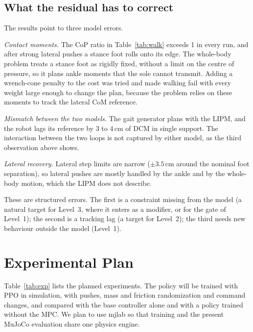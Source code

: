\documentclass[conference]{IEEEtran}
\begin{document}
\subsection{What the residual has to correct}
The results point to three model errors.

\emph{Contact moments.} The CoP ratio in Table~\ref{tab:walk} exceeds 1 in every run, and after strong lateral pushes a stance foot rolls onto its edge.
The whole-body problem treats a stance foot as rigidly fixed, without a limit on the centre of pressure, so it plans ankle moments that the sole cannot transmit.
Adding a wrench-cone penalty to the cost was tried and made walking fail with every weight large enough to change the plan, because the problem relies on these moments to track the lateral CoM reference.

\emph{Mismatch between the two models.} The gait generator plans with the LIPM, and the robot lags its reference by 3 to 4\,cm of DCM in single support.
The interaction between the two loops is not captured by either model, as the third observation above shows.

\emph{Lateral recovery.} Lateral step limits are narrow ($\pm3.5$\,cm around the nominal foot separation), so lateral pushes are mostly handled by the ankle and by the whole-body motion, which the LIPM does not describe.

These are structured errors.
The first is a constraint missing from the model (a natural target for Level~3, where it enters as a modifier, or for the gate of Level~1); the second is a tracking lag (a target for Level~2); the third needs new behaviour outside the model (Level~1).

\section{Experimental Plan}
\label{sec:plan}

Table~\ref{tab:exp} lists the planned experiments.
The policy will be trained with PPO \cite{schulman2017ppo} in simulation, with pushes, mass and friction randomization and command changes, and compared with the base controller alone and with a policy trained without the MPC.
We plan to use mjlab \cite{zakka2026mjlab} so that training and the present MuJoCo evaluation share one physics engine.
\end{document}
